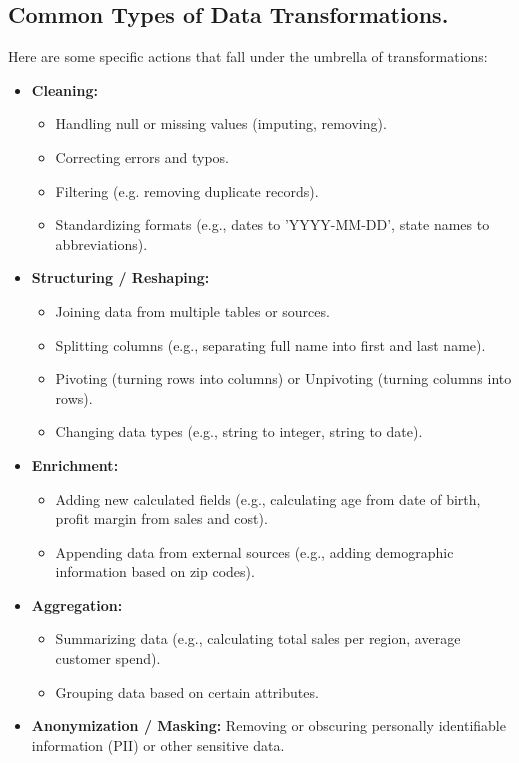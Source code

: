 \subsection*{Common Types of Data Transformations.}
Here are some specific actions that fall under the umbrella of transformations:
\begin{itemize}
    \item \textbf{Cleaning:}
    \begin{itemize}
        \item Handling null or missing values (imputing, removing).
        \item Correcting errors and typos.
        \item Filtering (e.g. removing duplicate records).
        \item Standardizing formats (e.g., dates to 'YYYY-MM-DD', state names
        to abbreviations).
    \end{itemize}
    
    \item \textbf{Structuring / Reshaping:}
    \begin{itemize}
        \item Joining data from multiple tables or sources.
        
        \item Splitting columns
        (e.g., separating full name into first and last name).

        \item Pivoting (turning rows into columns) or
        Unpivoting (turning columns into rows).

        \item Changing data types (e.g., string to integer,
        string to date).
    \end{itemize}

    \item \textbf{Enrichment:}
    \begin{itemize}
        \item Adding new calculated fields (e.g., calculating age
        from date of birth, profit margin from sales and cost).

        \item Appending data from external sources (e.g.,
        adding demographic information based on zip codes).
    \end{itemize}

    \item \textbf{Aggregation:}
    \begin{itemize}
        \item Summarizing data (e.g., calculating total sales
        per region, average customer spend).   

        \item Grouping data based on certain attributes.
    \end{itemize}

    \item \textbf{Anonymization / Masking:}
    Removing or obscuring personally identifiable information (PII)
    or other sensitive data.
\end{itemize}



